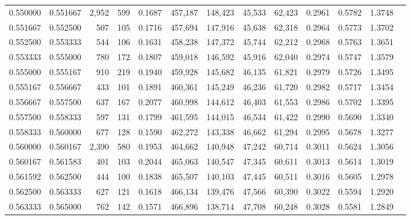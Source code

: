 \begin{tabular}{rrrrrrrrrrrrr}
0.550000 & 0.551667 & 2,952 & 599 &                                     0.1687 & 457,187 & 148,423 &  45,533 &  62,423 & 0.2961 & 0.5782 & 1.3748 \\
0.551667 & 0.552500 &   507 & 105 &                                     0.1716 & 457,694 & 147,916 &  45,638 &  62,318 & 0.2964 & 0.5773 & 1.3702 \\
0.552500 & 0.553333 &   544 & 106 &                                     0.1631 & 458,238 & 147,372 &  45,744 &  62,212 & 0.2968 & 0.5763 & 1.3651 \\
0.553333 & 0.555000 &   780 & 172 &                                     0.1807 & 459,018 & 146,592 &  45,916 &  62,040 & 0.2974 & 0.5747 & 1.3579 \\
0.555000 & 0.555167 &   910 & 219 &                                     0.1940 & 459,928 & 145,682 &  46,135 &  61,821 & 0.2979 & 0.5726 & 1.3495 \\
0.555167 & 0.556667 &   433 & 101 &                                     0.1891 & 460,361 & 145,249 &  46,236 &  61,720 & 0.2982 & 0.5717 & 1.3454 \\
0.556667 & 0.557500 &   637 & 167 &                                     0.2077 & 460,998 & 144,612 &  46,403 &  61,553 & 0.2986 & 0.5702 & 1.3395 \\
0.557500 & 0.558333 &   597 & 131 &                                     0.1799 & 461,595 & 144,015 &  46,534 &  61,422 & 0.2990 & 0.5690 & 1.3340 \\
0.558333 & 0.560000 &   677 & 128 &                                     0.1590 & 462,272 & 143,338 &  46,662 &  61,294 & 0.2995 & 0.5678 & 1.3277 \\
0.560000 & 0.560167 & 2,390 & 580 &                                     0.1953 & 464,662 & 140,948 &  47,242 &  60,714 & 0.3011 & 0.5624 & 1.3056 \\
0.560167 & 0.561583 &   401 & 103 &                                     0.2044 & 465,063 & 140,547 &  47,345 &  60,611 & 0.3013 & 0.5614 & 1.3019 \\
0.561592 & 0.562500 &   444 & 100 &                                     0.1838 & 465,507 & 140,103 &  47,445 &  60,511 & 0.3016 & 0.5605 & 1.2978 \\
0.562500 & 0.563333 &   627 & 121 &                                     0.1618 & 466,134 & 139,476 &  47,566 &  60,390 & 0.3022 & 0.5594 & 1.2920 \\
0.563333 & 0.565000 &   762 & 142 &                                     0.1571 & 466,896 & 138,714 &  47,708 &  60,248 & 0.3028 & 0.5581 & 1.2849 \\

\end{tabular}
